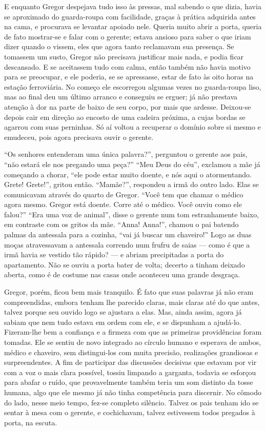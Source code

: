 E enquanto Gregor despejava tudo isso às pressas, mal sabendo o que dizia,
havia se aproximado do guarda-roupa com facilidade, graças à prática
adquirida antes na cama, e procurava se levantar apoiado nele.
Queria muito abrir a porta, queria de fato mostrar-se e falar com o
gerente; estava ansioso para saber o que iriam dizer quando o vissem, eles
que agora tanto reclamavam sua presença. Se tomassem um susto, Gregor não
precisava justificar mais nada, e podia ficar descansado. E se aceitassem
tudo com calma, então também não havia motivo para se preocupar, e ele
poderia, se se apressasse, estar de fato às oito horas na estação
ferroviária. No começo ele escorregou algumas vezes no guarda-roupa liso,
mas ao final deu um último arranco e conseguiu se erguer; já não prestava
atenção à dor na parte de baixo de seu corpo, por mais que ardesse.
Deixou-se depois cair em direção ao encosto de uma cadeira próxima, a cujas
bordas se agarrou com suas perninhas. Só aí voltou a recuperar o domínio
sobre si mesmo e emudeceu, pois agora precisava ouvir o gerente.

“Os senhores entenderam uma única palavra?”, perguntou o gerente aos pais,
“não estará ele nos pregando uma peça?” “Meu Deus do céu”, exclamou a mãe
já começando a chorar, “ele pode estar muito doente, e nós aqui o
atormentando. Grete! Grete!”, gritou então. “Mamãe?”, respondeu a irmã do
outro lado. Elas se comunicavam através do quarto de Gregor. “Você tem que
chamar o médico agora mesmo. Gregor está doente. Corre até o médico. Você
ouviu como ele falou?” “Era uma voz de animal”, disse o gerente num tom
estranhamente baixo, em contraste com os gritos da mãe. “Anna! Anna!”,
chamou o pai batendo palmas da antessala para a cozinha, “vai já buscar um
chaveiro!” Logo as duas moças atravessavam a antessala correndo num frufru
de saias --- como é que a irmã havia se vestido tão rápido? --- e abriam
precipitadas a porta do apartamento. Não se ouviu a porta bater de volta;
decerto a tinham deixado aberta, como é de costume nas casas onde
aconteceu uma grande desgraça.

Gregor, porém, ficou bem mais tranquilo. É fato que suas palavras já não
eram compreendidas, embora tenham lhe parecido claras, mais claras até do
que antes, talvez porque seu ouvido logo se ajustara a elas. Mas, ainda
assim, agora já sabiam que nem tudo estava em ordem com ele, e se
dispunham a ajudá-lo. Fizeram-lhe bem a confiança e a firmeza com que as
primeiras providências foram tomadas. Ele se sentiu de novo integrado ao
círculo humano e esperava de ambos, médico e chaveiro, sem distingui-los
com muita precisão, realizações grandiosas e surpreendentes. A fim de
participar das discussões decisivas que estavam por vir com a voz o mais
clara possível, tossiu limpando a garganta, todavia se esforçou para
abafar o ruído, que provavelmente também teria um som distinto da tosse
humana, algo que ele mesmo já não tinha competência para discernir. No
cômodo do lado, nesse meio tempo, fez-se completo silêncio. Talvez os pais
tenham ido se sentar à mesa com o gerente, e cochichavam, talvez
estivessem todos pregados à porta, na escuta.

